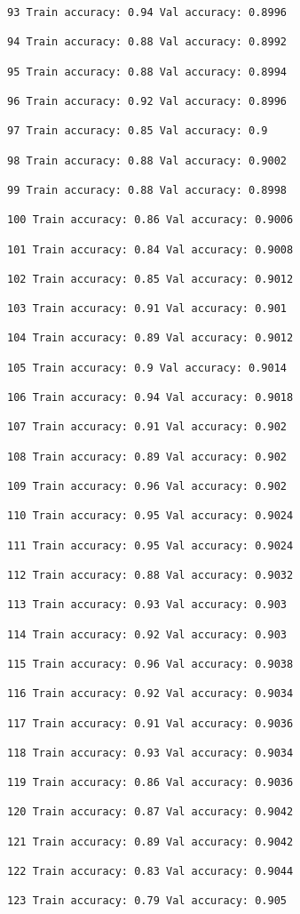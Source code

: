 \documentclass[11pt]{article}
\begin{document}
\begin{Verbatim}[commandchars=\\\{\}]
93 Train accuracy: 0.94 Val accuracy: 0.8996

94 Train accuracy: 0.88 Val accuracy: 0.8992

95 Train accuracy: 0.88 Val accuracy: 0.8994

96 Train accuracy: 0.92 Val accuracy: 0.8996

97 Train accuracy: 0.85 Val accuracy: 0.9

98 Train accuracy: 0.88 Val accuracy: 0.9002

99 Train accuracy: 0.88 Val accuracy: 0.8998

100 Train accuracy: 0.86 Val accuracy: 0.9006

101 Train accuracy: 0.84 Val accuracy: 0.9008

102 Train accuracy: 0.85 Val accuracy: 0.9012

103 Train accuracy: 0.91 Val accuracy: 0.901

104 Train accuracy: 0.89 Val accuracy: 0.9012

105 Train accuracy: 0.9 Val accuracy: 0.9014

106 Train accuracy: 0.94 Val accuracy: 0.9018

107 Train accuracy: 0.91 Val accuracy: 0.902

108 Train accuracy: 0.89 Val accuracy: 0.902

109 Train accuracy: 0.96 Val accuracy: 0.902

110 Train accuracy: 0.95 Val accuracy: 0.9024

111 Train accuracy: 0.95 Val accuracy: 0.9024

112 Train accuracy: 0.88 Val accuracy: 0.9032

113 Train accuracy: 0.93 Val accuracy: 0.903

114 Train accuracy: 0.92 Val accuracy: 0.903

115 Train accuracy: 0.96 Val accuracy: 0.9038

116 Train accuracy: 0.92 Val accuracy: 0.9034

117 Train accuracy: 0.91 Val accuracy: 0.9036

118 Train accuracy: 0.93 Val accuracy: 0.9034

119 Train accuracy: 0.86 Val accuracy: 0.9036

120 Train accuracy: 0.87 Val accuracy: 0.9042

121 Train accuracy: 0.89 Val accuracy: 0.9042

122 Train accuracy: 0.83 Val accuracy: 0.9044

123 Train accuracy: 0.79 Val accuracy: 0.905


\end{Verbatim}
\end{document}
